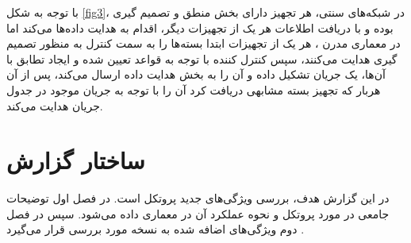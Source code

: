 با توجه به شکل \ref{fig3}، در شبکه‌های سنتی، هر تجهیز دارای بخش منطق و تصمیم گیری بوده و با دریافت اطلاعات هر یک از تجهیزات دیگر، اقدام به هدایت داده‌ها می‌کند اما در معماری مدرن ، هر یک از تجهیزات ابتدا بسته‌ها را به سمت کنترل به منظور تصمیم گیری هدایت می‌کنند، سپس کنترل کننده با توجه به قواعد تعیین شده و ایجاد تطابق با آن‌ها، یک جریان تشکیل داده و آن را به بخش هدایت داده ارسال می‌کند، پس از آن هربار که تجهیز بسته مشابهی دریافت کرد آن را با توجه به جریان موجود در جدول جریان هدایت می‌کند.

\section{ساختار گزارش}
در این گزارش هدف، بررسی ویژگی‌های جدید پروتکل  است. در فصل اول توضیحات جامعی در مورد پروتکل  و نحوه عملکرد آن در معماری  داده می‌شود. سپس در فصل دوم ویژگی‌های اضافه شده به نسخه‌  مورد بررسی قرار می‌گیرد .





